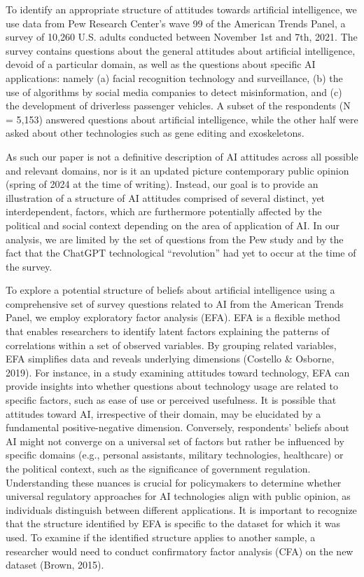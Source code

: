 To identify an appropriate structure of attitudes towards artificial intelligence, we use data from Pew Research Center’s wave 99 of the American Trends Panel, a survey of 10,260 U.S. adults conducted between November 1st and 7th, 2021. The survey contains questions about the general attitudes about artificial intelligence, devoid of a particular domain, as well as the questions about specific AI applications: namely (a) facial recognition technology and surveillance, (b) the use of algorithms by social media companies to detect misinformation, and (c) the development of driverless passenger vehicles. A subset of the respondents (N = 5,153) answered questions about artificial intelligence, while the other half were asked about other technologies such as gene editing and exoskeletons.

As such our paper is not a definitive description of AI attitudes across all possible and relevant domains, nor is it an updated picture contemporary public opinion (spring of 2024 at the time of writing). Instead, our goal is to provide an illustration of a structure of AI attitudes comprised of several distinct, yet interdependent, factors, which are furthermore potentially affected by the political and social context depending on the area of application of AI. In our analysis, we are limited by the set of questions from the Pew study and by the fact that the ChatGPT technological “revolution” had yet to occur at the time of the survey.

To explore a potential structure of beliefs about artificial intelligence using a comprehensive set of survey questions related to AI from the American Trends Panel, we employ exploratory factor analysis (EFA). EFA is a flexible method that enables researchers to identify latent factors explaining the patterns of correlations within a set of observed variables. By grouping related variables, EFA simplifies data and reveals underlying dimensions (Costello \& Osborne, 2019). For instance, in a study examining attitudes toward technology, EFA can provide insights into whether questions about technology usage are related to specific factors, such as ease of use or perceived usefulness. It is possible that attitudes toward AI, irrespective of their domain, may be elucidated by a fundamental positive-negative dimension. Conversely, respondents' beliefs about AI might not converge on a universal set of factors but rather be influenced by specific domains (e.g., personal assistants, military technologies, healthcare) or the political context, such as the significance of government regulation. Understanding these nuances is crucial for policymakers to determine whether universal regulatory approaches for AI technologies align with public opinion, as individuals distinguish between different applications. It is important to recognize that the structure identified by EFA is specific to the dataset for which it was used. To examine if the identified structure applies to another sample, a researcher would need to conduct confirmatory factor analysis (CFA) on the new dataset (Brown, 2015).

